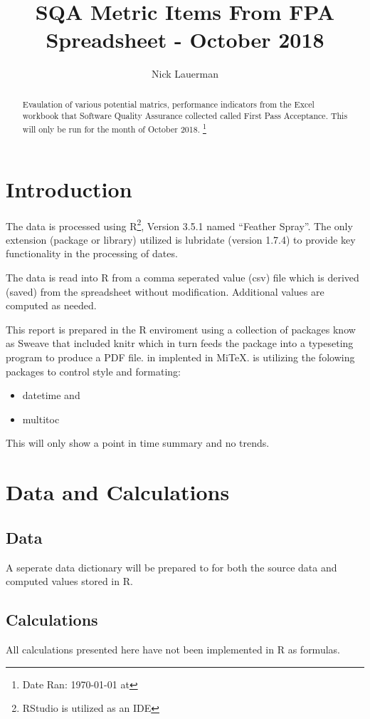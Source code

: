 \documentclass{article}
\title{SQA Metric Items From FPA Spreadsheet - October 2018}
\author{Nick Lauerman}
\date{}
\begin{document}

\maketitle

\begin{abstract}
Evaulation of various potential matrics, performance indicators from the Excel
workbook that Software Quality Assurance collected called First Pass
Acceptance. This will only be run for the month of October 2018.
\footnote{Date Ran: \today{} at \currenttime}
\end{abstract}

\tableofcontents

\section{Introduction}
The data is processed using R\footnote{RStudio is utilized as an IDE}, Version
3.5.1 named ``Feather Spray''. The only extension (package or library) utilized is
lubridate (version 1.7.4) to provide key functionality in the processing of dates.

The data is read into R from a comma seperated value (csv) file which is derived (saved)
from the spreadsheet without modification. Additional values are computed as needed.

This report is prepared in the R enviroment using a collection of packages know as
Sweave that included knitr which in turn feeds the package into \LaTeXe{} a typeseting
program to produce a PDF file. \LaTeXe{} in implented in Mi\TeX. \LaTeXe{} is utilizing
the folowing packages to control style and formating:
\begin{itemize}
\item datetime and
\item multitoc
\end{itemize}

This will only show a point in time summary and no trends.

\section{Data and Calculations}
\subsection{Data}
A seperate data dictionary will be prepared to for both the source data
and computed values stored in R.

\subsection{Calculations}
All calculations presented here have not been implemented in R as formulas.
\end{document}

